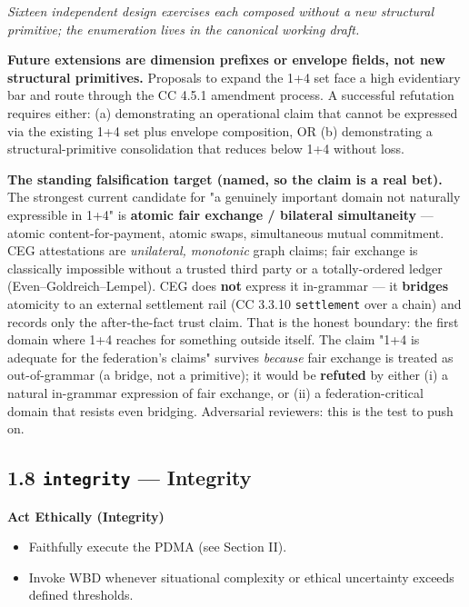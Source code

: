 \documentclass[11pt]{article}
\begin{document}
\textit{Sixteen independent design exercises each composed without a new structural primitive; the enumeration lives in the canonical working draft.}


\textbf{Future extensions are dimension prefixes or envelope fields, not new structural primitives.} Proposals to expand the 1+4 set face a high evidentiary bar and route through the CC 4.5.1 amendment process. A successful refutation requires either: (a) demonstrating an operational claim that cannot be expressed via the existing 1+4 set plus envelope composition, OR (b) demonstrating a structural-primitive consolidation that reduces below 1+4 without loss.


\textbf{The standing falsification target (named, so the claim is a real bet).} The strongest current candidate for "a genuinely important domain not naturally expressible in 1+4" is \textbf{atomic fair exchange / bilateral simultaneity} — atomic content-for-payment, atomic swaps, simultaneous mutual commitment. CEG attestations are \textit{unilateral, monotonic} graph claims; fair exchange is classically impossible without a trusted third party or a totally-ordered ledger (Even–Goldreich–Lempel). CEG does \textbf{not} express it in-grammar — it \textbf{bridges} atomicity to an external settlement rail (CC 3.3.10 \texttt{settlement} over a chain) and records only the after-the-fact trust claim. That is the honest boundary: the first domain where 1+4 reaches for something outside itself. The claim "1+4 is adequate for the federation's claims" survives \textit{because} fair exchange is treated as out-of-grammar (a bridge, not a primitive); it would be \textbf{refuted} by either (i) a natural in-grammar expression of fair exchange, or (ii) a federation-critical domain that resists even bridging. Adversarial reviewers: this is the test to push on.


\subsection*{1.8 \texttt{integrity} — Integrity}


\textbf{Act Ethically (Integrity)}

\begin{itemize}\setlength\itemsep{0pt}
\item Faithfully execute the PDMA (see Section II).
\item Invoke WBD whenever situational complexity or ethical uncertainty exceeds defined thresholds.
\end{itemize}
\end{document}
